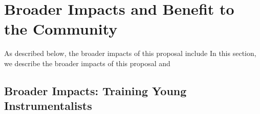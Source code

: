 \documentclass[preprint]{aastex}
\begin{document}

\vspace{-0.25in}
\section{Broader Impacts and Benefit to the Community}
\label{BIsec}

As described below, the broader impacts of this proposal include 
In this section, we describe the broader impacts of this proposal and

\vspace{-0.25in}
\subsection{Broader Impacts: Training Young Instrumentalists}

\end{document}
